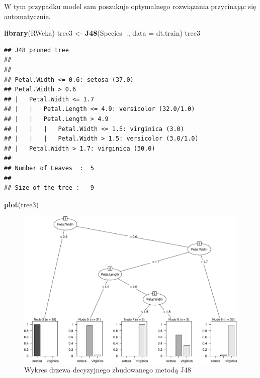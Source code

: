 \documentclass[]{book}
\newenvironment{Shaded}{\begin{snugshade}}{\end{snugshade}}
\newcommand{\DataTypeTok}[1]{\textcolor[rgb]{0.13,0.29,0.53}{#1}}
\newcommand{\KeywordTok}[1]{\textcolor[rgb]{0.13,0.29,0.53}{\textbf{#1}}}
\newcommand{\NormalTok}[1]{#1}
\newcommand{\OperatorTok}[1]{\textcolor[rgb]{0.81,0.36,0.00}{\textbf{#1}}}
\newcommand{\StringTok}[1]{\textcolor[rgb]{0.31,0.60,0.02}{#1}}
\theoremstyle{plain}
\theoremstyle{definition}
\theoremstyle{definition}
\theoremstyle{definition}
\theoremstyle{definition}
\theoremstyle{remark}
\begin{document}
W tym przypadku model sam poszukuje optymalnego rozwiązania przycinając się automatycznie.

\begin{Shaded}
\begin{Highlighting}[]
\KeywordTok{library}\NormalTok{(RWeka)}
\NormalTok{tree3 <-}\StringTok{ }\KeywordTok{J48}\NormalTok{(Species}\OperatorTok{~}\NormalTok{., }\DataTypeTok{data =}\NormalTok{ dt.train)}
\NormalTok{tree3}
\end{Highlighting}
\end{Shaded}

\begin{verbatim}
## J48 pruned tree
## ------------------
## 
## Petal.Width <= 0.6: setosa (37.0)
## Petal.Width > 0.6
## |   Petal.Width <= 1.7
## |   |   Petal.Length <= 4.9: versicolor (32.0/1.0)
## |   |   Petal.Length > 4.9
## |   |   |   Petal.Width <= 1.5: virginica (3.0)
## |   |   |   Petal.Width > 1.5: versicolor (3.0/1.0)
## |   Petal.Width > 1.7: virginica (30.0)
## 
## Number of Leaves  :  5
## 
## Size of the tree :   9
\end{verbatim}

\begin{Shaded}
\begin{Highlighting}[]
\KeywordTok{plot}\NormalTok{(tree3)}
\end{Highlighting}
\end{Shaded}

\begin{figure}
\centering
\includegraphics{EksploracjaDanych_files/figure-latex/J48-1.pdf}
\caption{\label{fig:J48}Wykres drzewa decyzyjnego zbudowanego metodą J48}
\end{figure}
\end{document}
